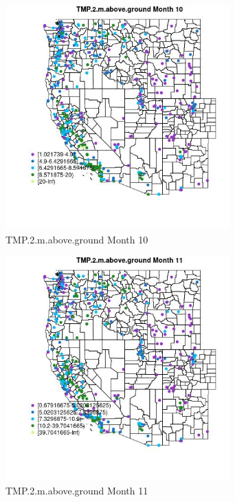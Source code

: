 \begin{figure} 
\centering  
\includegraphics[width=0.77\textwidth]{Code_Outputs/ML_input_report_ML_input_PM25_Step5_part_d_de_duplicated_aves_ML_input_MapObsMo10TMP2maboveground.jpg} 
\caption{\label{fig:ML_input_report_ML_input_PM25_Step5_part_d_de_duplicated_aves_ML_inputMapObsMo10TMP2maboveground}TMP.2.m.above.ground Month 10} 
\end{figure} 
 

\begin{figure} 
\centering  
\includegraphics[width=0.77\textwidth]{Code_Outputs/ML_input_report_ML_input_PM25_Step5_part_d_de_duplicated_aves_ML_input_MapObsMo11TMP2maboveground.jpg} 
\caption{\label{fig:ML_input_report_ML_input_PM25_Step5_part_d_de_duplicated_aves_ML_inputMapObsMo11TMP2maboveground}TMP.2.m.above.ground Month 11} 
\end{figure} 
 

